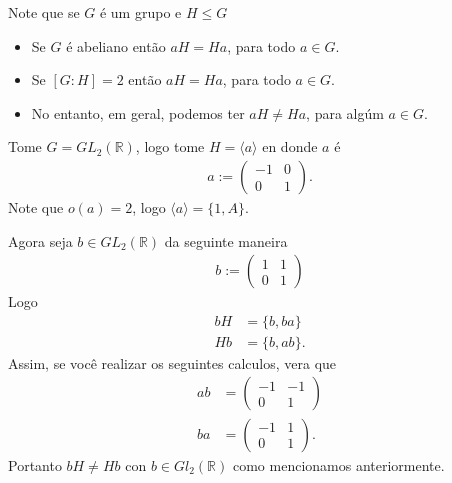 \begin{note}\label{obs:propclasseslaterais}
  Note que se $G$ é um grupo e $H\leq G$
  \begin{itemize}
    \item Se $G$ é abeliano então $aH=Ha$, para todo $a\in G$.
    \item Se $[G:H]=2$ então $aH=Ha$, para todo $a\in G$.
    \item No entanto, em geral, podemos ter $aH\neq Ha$, para algúm $a\in G$. 
  \end{itemize}
\end{note}
Tome $G=GL_2(\mathbb{R})$, logo tome $H=\langle a \rangle$ en donde $a$ é
\begin{align*}
  a:=\begin{pmatrix}
    -1 & 0 \\
    0 & 1
  \end{pmatrix}.
\end{align*}
Note que $o(a)=2$, logo $\langle a \rangle=\{1,A\}$.

Agora seja $b\in GL_2(\mathbb{R})$ da seguinte maneira
\begin{align*}
  b:=\begin{pmatrix}
    1 & 1 \\
    0 & 1
  \end{pmatrix}
\end{align*}
Logo
\begin{align*}
  bH&=\{b,ba\}\\
  Hb&=\{b,ab\}.
\end{align*}
Assim, se você realizar os seguintes calculos, vera que
\begin{align*}
  ab&=\begin{pmatrix}
    -1 & -1 \\
    0 & 1
  \end{pmatrix}\\
  ba&=\begin{pmatrix}
    -1 & 1 \\
    0 & 1
  \end{pmatrix}.
\end{align*}
Portanto $bH\neq Hb$ con $b\in Gl_2(\mathbb{R})$ como mencionamos anteriormente.

